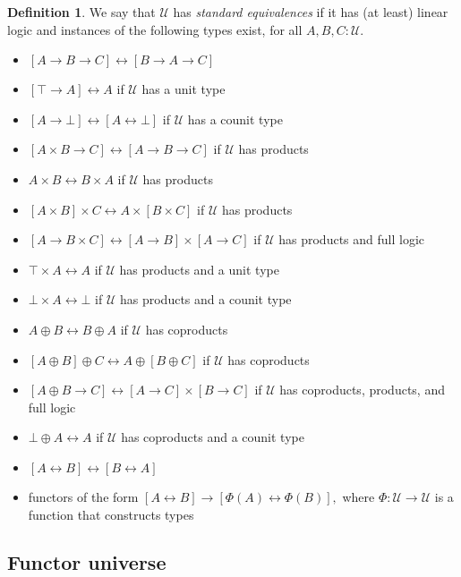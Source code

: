 \documentclass[a4paper]{article}
\theoremstyle{definition}
\newtheorem{definition}{Definition}[section]
\theoremstyle{remark}
\newcommand{\defn}{\emph}
\newcommand{\U}{\mathcal{U}}
\begin{document}
\begin{definition}
  We say that $\U$ has \defn{standard equivalences} if it has (at least) linear logic and instances
  of the following types exist, for all $A,B,C : \U.$
  \begin{itemize}
    \item $[A \to B \to C] \leftrightarrow [B \to A \to C]$
    \item $[\top \to A] \leftrightarrow A$ if $\U$ has a unit type
    \item $[A \to \bot] \leftrightarrow [A \leftrightarrow \bot]$ if $\U$ has a counit type
    \item $[A \times B \to C] \leftrightarrow [A \to B \to C]$ if $\U$ has products
    \item $A \times B \leftrightarrow B \times A$ if $\U$ has products
    \item $[A \times B] \times C \leftrightarrow A \times [B \times C]$ if $\U$ has products
    \item $[A \to B \times C] \leftrightarrow [A \to B] \times [A \to C]$ if $\U$ has products
    and full logic
    \item $\top \times A \leftrightarrow A$ if $\U$ has products and a unit type
    \item $\bot \times A \leftrightarrow \bot$ if $\U$ has products and a counit type
    \item $A \oplus B \leftrightarrow B \oplus A$ if $\U$ has coproducts
    \item $[A \oplus B] \oplus C \leftrightarrow A \oplus [B \oplus C]$ if $\U$ has coproducts
    \item $[A \oplus B \to C] \leftrightarrow [A \to C] \times [B \to C]$ if $\U$ has coproducts,
    products, and full logic
    \item $\bot \oplus A \leftrightarrow A$ if $\U$ has coproducts and a counit type
    \item $[A \leftrightarrow B] \leftrightarrow [B \leftrightarrow A]$
    \item functors of the form $[A \leftrightarrow B] \to [\Phi(A) \leftrightarrow \Phi(B)],$ where
    $\Phi : \U \to \U$ is a function that constructs types
  \end{itemize}
\end{definition}

\subsection{Functor universe}
\label{sec:layer1-functor-universe}
\end{document}
